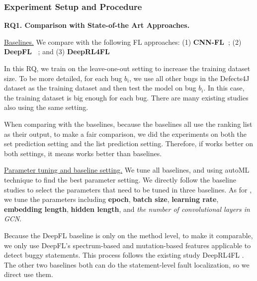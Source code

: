 \subsubsection{Experiment Setup and Procedure}
\hspace{1cm}

{\bf RQ1. Comparison with State-of-the Art Approaches.}

\underline{Baselines.} We compare {\tool} with the following FL approaches: (1) \textbf{CNN-FL~\cite{zhang2019cnn}}; (2) \textbf{DeepFL~\cite{DeepFL}} ; and (3) \textbf{DeepRL4FL~\cite{li2021fault}}



In this RQ, we train \tool on the leave-one-out setting to increase the training dataset size. To be more detailed, for each bug $b_i$, we use all other bugs in the Defects4J dataset as the training dataset and then test the model on bug $b_i$. In this case, the training dataset is big enough for each bug. There are many existing studies \cite{DeepFL, TraPT} also using the same setting. 

When comparing with the baselines, because the baselines all use the ranking list as their output, to make a fair comparison, we did the experiments on both the set prediction setting and the list prediction setting. Therefore, if \tool works better on both settings, it means \tool works better than baselines.

\underline{ Parameter tuning and baseline setting.} We tune all baselines, and \tool using autoML technique \cite{NNI} to find the best parameter setting. We directly follow the baseline studies to select the parameters that need to be tuned in three baselines. As for \tool, we tune the parameters including {\bf epoch}, {\bf batch size}, {\bf learning rate}, {\bf embedding length}, {\bf hidden length}, and {\it the number of convolutional layers in GCN}.

Because the DeepFL baseline is only on the method level, to make it comparable, we only use DeepFL's spectrum-based and mutation-based features applicable to detect buggy statements. This process follows the existing study DeepRL4FL \cite{li2021fault}. The other two baselines both can do the statement-level fault localization, so we direct use them.

